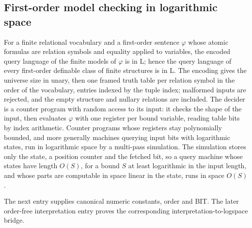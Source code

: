 \begin{result}
\subsection{First-order model checking in logarithmic space}
For a finite relational vocabulary and a first-order sentence $\varphi$ whose
atomic formulas are relation symbols and equality applied to variables, the
encoded query language of the finite models of $\varphi$ is in L; hence the
query language of every first-order definable class of finite structures is in
L. The encoding gives the universe size in unary, then one framed truth table
per relation symbol in the order of the vocabulary, entries indexed by the
tuple index; malformed inputs are rejected, and the empty structure and nullary
relations are included. The decider is a counter program with random access to
its input: it checks the shape of the input, then evaluates $\varphi$ with one
register per bound variable, reading table bits by index arithmetic. Counter
programs whose registers stay polynomially bounded, and more generally machines
querying input bits with logarithmic states, run in logarithmic space by a
multi-pass simulation.\citep[Theorem 3.1]{Immerman1999}
The simulation stores only the state, a position counter and the fetched bit,
so a query machine whose states have length $O(S)$, for a bound $S$ at least
logarithmic in the input length, and whose parts are computable in space linear
in the state, runs in space $O(S)$.

The next entry supplies canonical numeric constants, order and BIT. The later
order-free interpretation entry proves the corresponding interpretation-to-logspace bridge.
\end{result}

